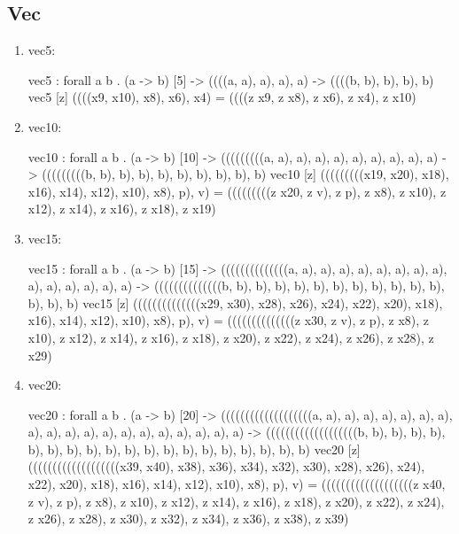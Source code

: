 \subsection{Vec}
\begin{enumerate}
\item vec5:
\begin{granule}
vec5 : forall a b  
     . (a -> b) [5] 
     -> ((((a, a), a), a), a) 
     -> ((((b, b), b), b), b)
vec5 [z] ((((x9, x10), x8), x6), x4) = 
    ((((z x9, z x8), z x6), z x4), z x10)
\end{granule}
\item vec10:
\begin{granule}
vec10 : forall a b 
      . (a -> b) [10] 
      -> (((((((((a, a), a), a), a), a), a), a), a), a)
      -> (((((((((b, b), b), b), b), b), b), b), b), b)
vec10 [z] (((((((((x19, x20), x18), x16), x14), x12), x10), x8), p), v) = 
    (((((((((z x20, z v), z p), z x8), z x10), z x12), z x14), z x16), z x18), z x19)
\end{granule}
\item vec15:
\begin{granule}
vec15 : forall a b 
      . (a -> b) [15] 
      -> ((((((((((((((a, a), a), a), a), a), a), a), a), a), a), a), a), a), a)
      -> ((((((((((((((b, b), b), b), b), b), b), b), b), b), b), b), b), b), b)
vec15 [z] ((((((((((((((x29, x30), x28), x26), x24), x22), x20), x18), x16), x14), x12), x10), x8), p), v) = 
    ((((((((((((((z x30, z v), z p), z x8), z x10), z x12), z x14), z x16), z x18), z x20), z x22), z x24), z x26), z x28), z x29)
\end{granule}
\item vec20:
\begin{granule}
vec20 : forall a b 
      . (a -> b) [20] 
      -> (((((((((((((((((((a, a), a), a), a), a), a), a), a), a), a), a), a), a), a), a), a), a), a), a)
      -> (((((((((((((((((((b, b), b), b), b), b), b), b), b), b), b), b), b), b), b), b), b), b), b), b)
vec20 [z] (((((((((((((((((((x39, x40), x38), x36), x34), x32), x30), x28), x26), x24), x22), x20), x18), x16), x14), x12), x10), x8), p), v) = 
    (((((((((((((((((((z x40, z v), z p), z x8), z x10), z x12), z x14), z x16), z x18), z x20), z x22), z x24), z x26), z x28), z x30), z x32), z x34), z x36), z x38), z x39)
\end{granule}
\end{enumerate}

